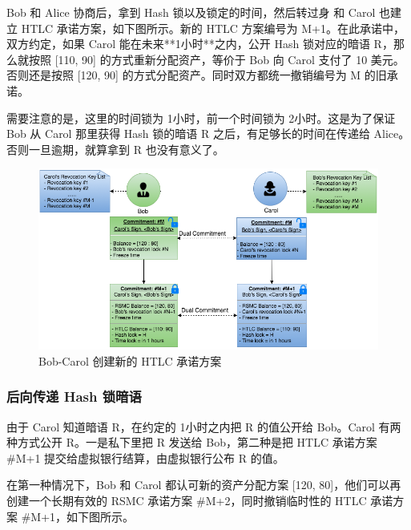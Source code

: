 Bob 和 Alice 协商后，拿到 Hash 锁以及锁定的时间，然后转过身 和 Carol 也建立 HTLC 承诺方案，如下图所示。新的 HTLC 方案编号为 M+1。在此承诺中，双方约定，如果 Carol 能在未来**1小时**之内，公开 Hash 锁对应的暗语 R，那么就按照 [110, 90] 的方式重新分配资产，等价于 Bob 向 Carol 支付了 10 美元。否则还是按照 [120, 90] 的方式分配资产。同时双方都统一撤销编号为 M 的旧承诺。

需要注意的是，这里的时间锁为 1小时，前一个时间锁为 2小时。这是为了保证 Bob 从 Carol 那里获得 Hash 锁的暗语 R 之后，有足够长的时间在传递给 Alice。否则一旦逾期，就算拿到 R 也没有意义了。

\begin{figure}[h!]
    \centering
    \includegraphics[width=12cm, keepaspectratio]{../images/bob_carol_2.png}
    \caption{Bob-Carol 创建新的 HTLC 承诺方案}
    \label{fig:bob_carol_2}
\end{figure}

\subsubsection{后向传递 Hash 锁暗语}
由于 Carol 知道暗语 R，在约定的 1小时之内把 R 的值公开给 Bob。Carol 有两种方式公开 R。一是私下里把 R 发送给 Bob，第二种是把 HTLC 承诺方案 \#M+1 提交给虚拟银行结算，由虚拟银行公布 R 的值。

在第一种情况下，Bob 和 Carol 都认可新的资产分配方案 [120, 80]，他们可以再创建一个长期有效的 RSMC 承诺方案 \#M+2，同时撤销临时性的 HTLC 承诺方案 \#M+1，如下图所示。

